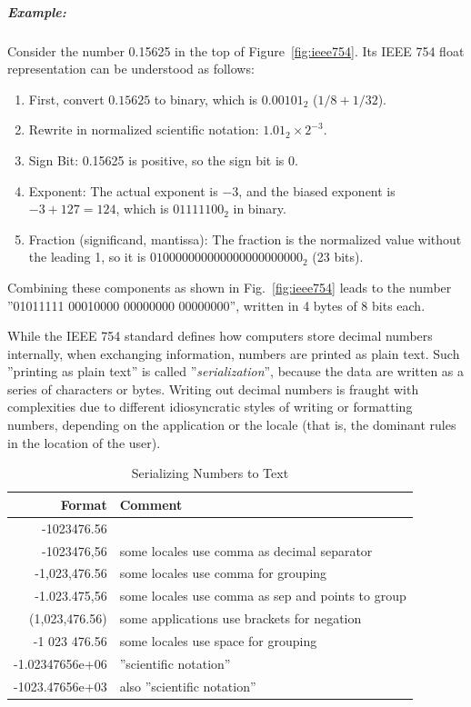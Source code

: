 \begin{advanced}
\subparagraph*{Example:} Consider the number 0.15625 in the top of Figure~\ref{fig:ieee754}. Its IEEE 754 float representation can be understood as follows:
\begin{enumerate}
	\item First, convert $0.15625$ to binary, which is $0.00101_2$ ($1/8+1/32$).
	\item Rewrite in normalized scientific notation: $1.01_2 \times 2^{-3}$.
	\item Sign Bit: 0.15625 is positive, so the sign bit is 0.
	\item Exponent: The actual exponent is $-3$, and the biased exponent is $-3+127=124$, which is $01111100_2$ in binary.
	\item Fraction (significand, mantissa): The fraction is the normalized value without the leading 1, so it is $010000000000000000000000_2$ (23 bits).
\end{enumerate}

Combining these components as shown in Fig.~\ref{fig:ieee754} leads to the number ''01011111 00010000 00000000 00000000'', written in 4 bytes of 8 bits each.
\end{advanced}

While the IEEE 754 standard defines how computers store decimal numbers internally, when exchanging information, numbers are printed as plain text. Such ''printing as plain text'' is called ''\emph{serialization}'', because the data are written as a series of characters or bytes. Writing out decimal numbers is fraught with complexities due to different idiosyncratic styles of writing or formatting numbers, depending on the application or the locale (that is, the dominant rules in the location of the user). 

\begin{table}[h]
\renewcommand{\arraystretch}{1.25}
\centering

\begin{tabular}{r|l} \hline
\textbf{Format} & \textbf{Comment} \\ \hline
-1023476.56 & \\
-1023476,56 & some locales use comma as decimal separator \\
-1,023,476.56 & some locales use comma for grouping \\
-1.023.475,56 & some locales use comma as sep and points to group \\
(1,023,476.56) & some applications use brackets for negation \\
-1 023 476.56 & some locales use space for grouping \\
-1.02347656e+06 & ''scientific notation'' \\
-1023.47656e+03 & also ''scientific notation'' \\ \hline
\end{tabular}
\caption{Serializing Numbers to Text}
\label{tab:floatingpointtext}
\end{table}

